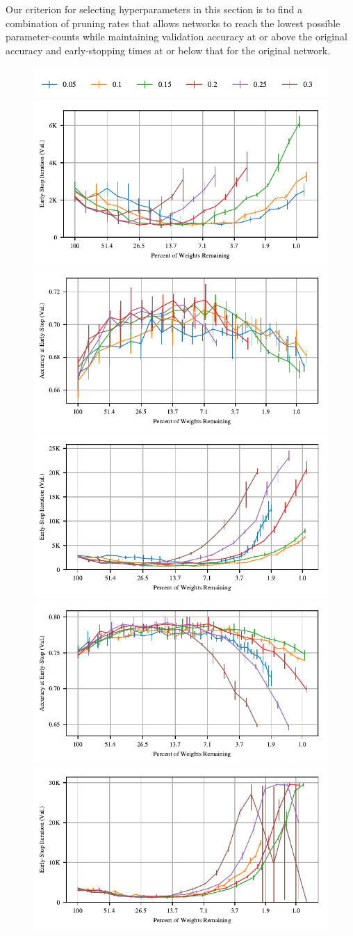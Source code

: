 Our criterion for selecting hyperparameters in this section is to find a combination of pruning rates that allows networks to reach the lowest possible parameter-counts
while maintaining validation accuracy at or above the original accuracy and early-stopping times at or below that for the original network.

\begin{figure}
\centering
\includegraphics[width=.5\textwidth]{graphs/cifar10/conv/conv_rate_sweep1/legend}
\includegraphics[width=.5\textwidth]{graphs/cifar10/conv/conv_rate_sweep1/iteration}%
\includegraphics[width=.5\textwidth]{graphs/cifar10/conv/conv_rate_sweep1/accuracy}
\includegraphics[width=.5\textwidth]{graphs/cifar10/conv/conv_rate_sweep2/iteration}%
\includegraphics[width=.5\textwidth]{graphs/cifar10/conv/conv_rate_sweep2/accuracy}
\includegraphics[width=.5\textwidth]{graphs/cifar10/conv/conv_rate_sweep3/iteration}%

\end{figure}
